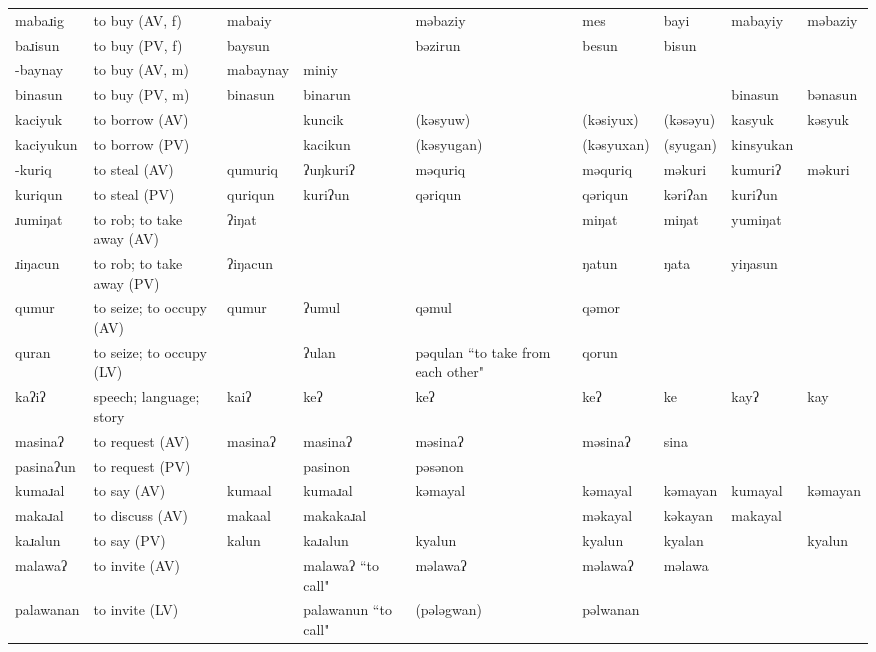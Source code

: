 \begin{landscape}
\begin{longtable}{*{9}{p{}}}
\text{*}mabaɹig & to buy (AV, f) & mabaiy &  & məbaziy & mes & bayi & mabayiy & məbaziy\\
\text{*}baɹisun & to buy (PV, f) & baysun &  & bəzirun & besun & bisun &  & \\
\text{*}-baynay & to buy (AV, m) & mabaynay & miniy &  &  &  &  & \\
\text{*}binasun & to buy (PV, m) & binasun & binarun &  &  &  & binasun & bənasun\\
\text{*}kaciyuk & to borrow (AV) &  & kuncik & (kəsyuw) & (kəsiyux) & (kəsəyu) & kasyuk & kəsyuk\\
\text{*}kaciyukun & to borrow (PV) &  & kacikun & (kəsyugan) & (kəsyuxan) & (syugan) & kinsyukan & \\
\text{*}-kuriq & to steal (AV) & qumuriq & ʔuŋkuriʔ & məquriq & məquriq & məkuri & kumuriʔ & məkuri\\
\text{*}kuriqun & to steal (PV) & quriqun & kuriʔun & qəriqun & qəriqun & kəriʔan & kuriʔun & \\
\text{*}ɹumiŋat & to rob; to take away (AV) & ʔiŋat &  &  & miŋat & miŋat & yumiŋat & \\
\text{*}ɹiŋacun & to rob; to take away (PV) & ʔiŋacun &  &  & ŋatun & ŋata & yiŋasun & \\
\text{*}qumur & to seize; to occupy (AV) & qumur & ʔumul & qəmul & qəmor &  &  & \\
\text{*}quran & to seize; to occupy (LV) &  & ʔulan & pəqulan ``to take from each other" & qorun &  &  & \\
\text{*}kaʔiʔ & speech; language; story & kaiʔ & keʔ & keʔ & keʔ & ke & kayʔ & kay\\
\text{*}masinaʔ & to request (AV) & masinaʔ & masinaʔ & məsinaʔ & məsinaʔ & sina &  & \\
\text{*}pasinaʔun & to request (PV) &  & pasinon & pəsənon &  &  &  & \\
\text{*}kumaɹal & to say (AV) & kumaal & kumaɹal & kəmayal & kəmayal & kəmayan & kumayal & kəmayan\\
\text{*}makaɹal & to discuss (AV) & makaal & makakaɹal &  & məkayal & kəkayan & makayal & \\
\text{*}kaɹalun & to say (PV) & kalun & kaɹalun & kyalun & kyalun & kyalan &  & kyalun\\
\text{*}malawaʔ & to invite (AV) &  & malawaʔ ``to call" & məlawaʔ & məlawaʔ & məlawa &  & \\
\text{*}palawanan & to invite (LV) &  & palawanun ``to call" & (pələgwan) & pəlwanan &  &  & \\

\end{longtable}
\end{landscape}
